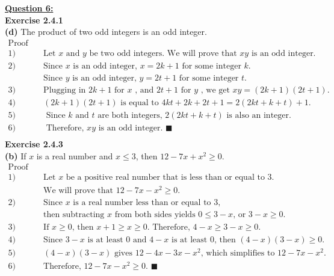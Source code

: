 \documentclass[12pt, letterpaper, twoside]{article}
\begin{document}
\newpage
\noindent \textbf{\underline{Question 6:}}\\
\noindent \textbf{Exercise 2.4.1}\\
\textbf{(d)} The product of two odd integers is an odd integer.
\begin{align*}
\text{Proof} &\\
1) & \quad \text{Let } x \text{ and } y \text{ be two odd integers. We will prove that } xy \text{ is an odd integer.}\\
2) & \quad \text{Since } x \text{ is an odd integer, } x = 2k + 1 \text{ for some integer } k\text{.} \\
&\quad \text{Since } y \text{ is an odd integer, } y = 2t + 1 \text{ for some integer } t\text{.}\\
3) & \quad \text{Plugging in } 2k+1 \text{ for } x\text{ , and } 2t + 1 \text{ for } y\text{ , we get } xy = (2k + 1)(2t + 1)\text{.} \\
4) & \quad (2k + 1)(2t + 1) \text{ is equal to } 4kt + 2k+ 2t + 1 = 2(2kt + k + t) + 1\text{.}\\
5) & \quad \text{ Since } k \text{ and } t \text{ are both integers, } 2(2kt + k + t) \text{ is also an integer. }\\
6) & \quad \text{ Therefore, } xy \text{ is an odd integer. } \blacksquare\\
\end{align*}
\noindent \textbf{Exercise 2.4.3}\\
\textbf{(b)} If $x$ is a real number and $x \leq 3$, then $12 - 7x + x^2 \geq 0$.\\
\begin{align*}
\text{Proof} &\\
1) & \quad \text{Let } x \text{ be a positive real number that is less than or equal to 3.}\\
   & \quad \text{We will prove that } 12-7x-x^2 \geq 0 \text{.}\\
2) & \quad \text{Since } x \text{ is a real number less than or equal to 3,}\\ 
   & \quad \text{then subtracting } x\text{ from both sides yields } 0 \leq 3 - x \text{, or } 3 - x \geq 0\text{.} \\
3) &\quad \text{If } x \geq 0 \text{, then } x + 1 \geq x \geq 0 \text{. Therefore, } 4-x \geq 3 - x \geq 0\text{.}\\
4) & \quad \text{Since } 3-x \text{ is at least } 0  \text{ and } 4 - x \text{ is at least } 0 \text{, then } (4 - x)(3 - x) \geq 0 \text{.} \\
5) & \quad (4 - x)(3 - x) \text{ gives } 12-4x-3x-x^2\text{, which simplifies to } 12-7x-x^2 \text{.}\\
6) & \quad \text{Therefore, } 12-7x-x^2 \geq 0 \text{. } \blacksquare\\
\end{align*}
\end{document}
